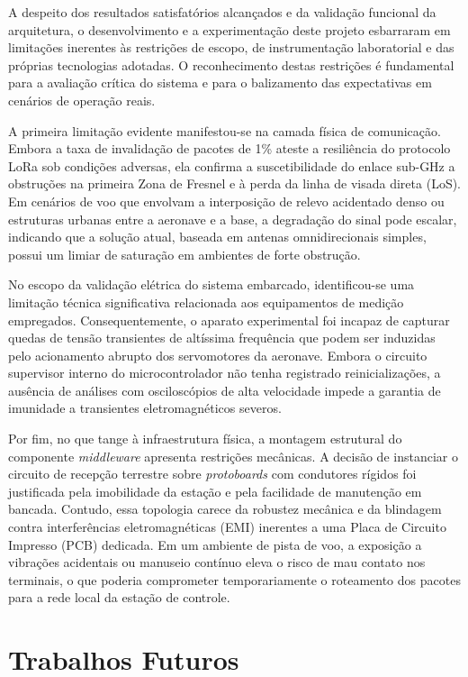 A despeito dos resultados satisfatórios alcançados e da validação funcional da arquitetura, o desenvolvimento e a experimentação deste projeto esbarraram em limitações inerentes às restrições de escopo, de instrumentação laboratorial e das próprias tecnologias adotadas. O reconhecimento destas restrições é fundamental para a avaliação crítica do sistema e para o balizamento das expectativas em cenários de operação reais.

A primeira limitação evidente manifestou-se na camada física de comunicação. Embora a taxa de invalidação de pacotes de 1\% ateste a resiliência do protocolo LoRa sob condições adversas, ela confirma a suscetibilidade do enlace sub-GHz a obstruções na primeira Zona de Fresnel e à perda da linha de visada direta (LoS). Em cenários de voo que envolvam a interposição de relevo acidentado denso ou estruturas urbanas entre a aeronave e a base, a degradação do sinal pode escalar, indicando que a solução atual, baseada em antenas omnidirecionais simples, possui um limiar de saturação em ambientes de forte obstrução.

No escopo da validação elétrica do sistema embarcado, identificou-se uma limitação técnica significativa relacionada aos equipamentos de medição empregados. Consequentemente, o aparato experimental foi incapaz de capturar quedas de tensão transientes de altíssima frequência que podem ser induzidas pelo acionamento abrupto dos servomotores da aeronave. Embora o circuito supervisor interno do microcontrolador não tenha registrado reinicializações, a ausência de análises com osciloscópios de alta velocidade impede a garantia de imunidade a transientes eletromagnéticos severos.

Por fim, no que tange à infraestrutura física, a montagem estrutural do componente \textit{middleware} apresenta restrições mecânicas. A decisão de instanciar o circuito de recepção terrestre sobre \textit{protoboards} com condutores rígidos foi justificada pela imobilidade da estação e pela facilidade de manutenção em bancada. Contudo, essa topologia carece da robustez mecânica e da blindagem contra interferências eletromagnéticas (EMI) inerentes a uma Placa de Circuito Impresso (PCB) dedicada. Em um ambiente de pista de voo, a exposição a vibrações acidentais ou manuseio contínuo eleva o risco de mau contato nos terminais, o que poderia comprometer temporariamente o roteamento dos pacotes para a rede local da estação de controle.


\section{Trabalhos Futuros}

